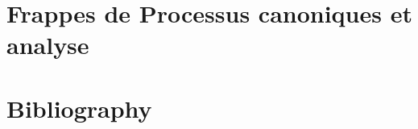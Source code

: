 \documentclass[fleqn,8pt,t]{beamer}
\begin{document}
\section{Frappes de Processus canoniques et analyse}



% 
% 
% 
% 
% 
% 

\appendix

\section[x]{Bibliography}


\end{document}
